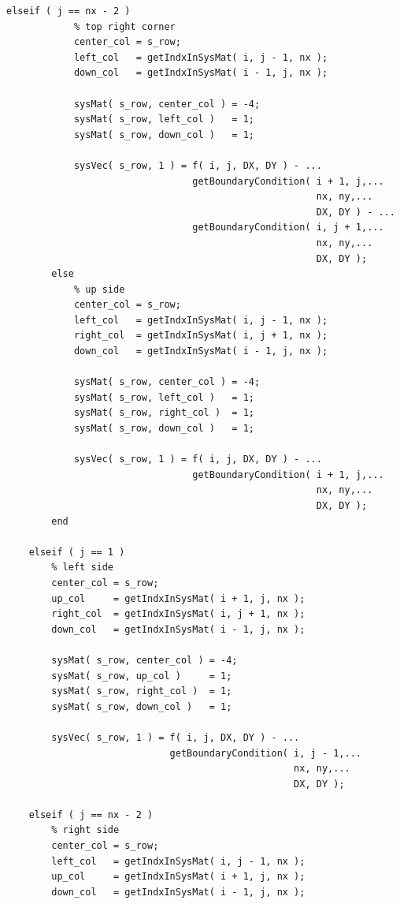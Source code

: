 \begin{itemize}
\begin{lstlisting}[frame=single]
        elseif ( j == nx - 2 )
            % top right corner
            center_col = s_row;
            left_col   = getIndxInSysMat( i, j - 1, nx );
            down_col   = getIndxInSysMat( i - 1, j, nx );

            sysMat( s_row, center_col ) = -4;
            sysMat( s_row, left_col )   = 1;
            sysMat( s_row, down_col )   = 1;

            sysVec( s_row, 1 ) = f( i, j, DX, DY ) - ...
                                 getBoundaryCondition( i + 1, j,...
                                                       nx, ny,...
                                                       DX, DY ) - ...
                                 getBoundaryCondition( i, j + 1,...
                                                       nx, ny,...
                                                       DX, DY );
        else
            % up side
            center_col = s_row;
            left_col   = getIndxInSysMat( i, j - 1, nx );
            right_col  = getIndxInSysMat( i, j + 1, nx );
            down_col   = getIndxInSysMat( i - 1, j, nx );

            sysMat( s_row, center_col ) = -4;
            sysMat( s_row, left_col )   = 1;
            sysMat( s_row, right_col )  = 1;
            sysMat( s_row, down_col )   = 1;

            sysVec( s_row, 1 ) = f( i, j, DX, DY ) - ...
                                 getBoundaryCondition( i + 1, j,...
                                                       nx, ny,...
                                                       DX, DY );
        end
        
    elseif ( j == 1 )
        % left side
        center_col = s_row;
        up_col     = getIndxInSysMat( i + 1, j, nx );
        right_col  = getIndxInSysMat( i, j + 1, nx );
        down_col   = getIndxInSysMat( i - 1, j, nx );

        sysMat( s_row, center_col ) = -4;
        sysMat( s_row, up_col )     = 1;
        sysMat( s_row, right_col )  = 1;
        sysMat( s_row, down_col )   = 1;

        sysVec( s_row, 1 ) = f( i, j, DX, DY ) - ...
                             getBoundaryCondition( i, j - 1,...
                                                   nx, ny,...
                                                   DX, DY );
           
    elseif ( j == nx - 2 )
        % right side
        center_col = s_row;
        left_col   = getIndxInSysMat( i, j - 1, nx );
        up_col     = getIndxInSysMat( i + 1, j, nx );
        down_col   = getIndxInSysMat( i - 1, j, nx );


\end{lstlisting}
\end{itemize}
